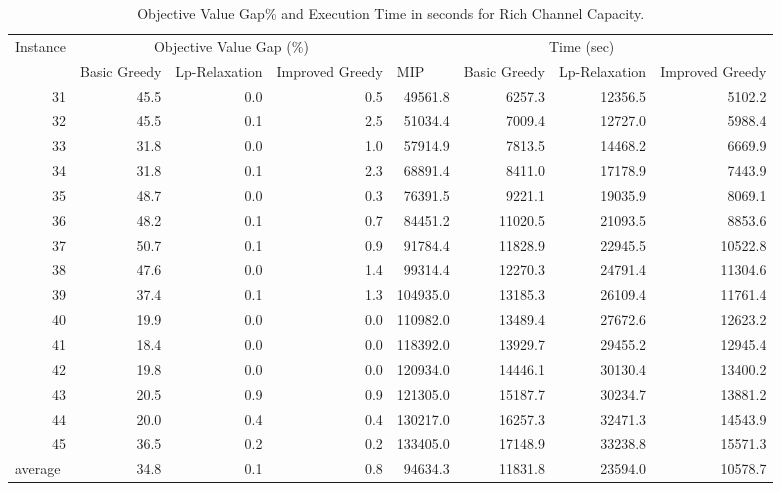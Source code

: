 \documentclass[11pt]{article}
\begin{document}
\begin{table}[htbp]
  \centering
  \caption{Objective Value Gap\% and Execution Time in seconds for Rich Channel Capacity.}\label{table:tbl_exact_rich_results_large}
  \begin{adjustbox}{max width=1\textwidth}
    \begin{tabular}{|l|rrr|rrrr|}
    \toprule
    \multicolumn{1}{|c|}{\multirow{2}[4]{*}{Instance}} & \multicolumn{3}{c|}{Objective Value Gap (\%)} & \multicolumn{4}{c|}{Time (sec)} \\
\cmidrule{2-8}          & \multicolumn{1}{l}{Basic Greedy} & \multicolumn{1}{l}{Lp-Relaxation} & \multicolumn{1}{l|}{Improved Greedy} & \multicolumn{1}{l}{MIP} & \multicolumn{1}{l}{Basic Greedy} & \multicolumn{1}{l}{Lp-Relaxation} & \multicolumn{1}{l|}{Improved Greedy} \\
    \midrule
    \multicolumn{1}{|r|}{31} & 45.5  & 0.0     & 0.5   & 49561.8 & 6257.3 & 12356.5 & 5102.2 \\
    \multicolumn{1}{|r|}{32} & 45.5  & 0.1   & 2.5   & 51034.4 & 7009.4 & 12727.0 & 5988.4 \\
    \multicolumn{1}{|r|}{33} & 31.8  & 0.0     & 1.0     & 57914.9 & 7813.5 & 14468.2 & 6669.9 \\
    \multicolumn{1}{|r|}{34} & 31.8  & 0.1   & 2.3   & 68891.4 & 8411.0  & 17178.9 & 7443.9 \\
    \multicolumn{1}{|r|}{35} & 48.7  & 0.0     & 0.3   & 76391.5 & 9221.1 & 19035.9 & 8069.1 \\
    \multicolumn{1}{|r|}{36} & 48.2  & 0.1   & 0.7   & 84451.2 & 11020.5 & 21093.5 & 8853.6 \\
    \multicolumn{1}{|r|}{37} & 50.7  & 0.1   & 0.9   & 91784.4 & 11828.9 & 22945.5 & 10522.8 \\
    \multicolumn{1}{|r|}{38} & 47.6  & 0.0    & 1.4   & 99314.4 & 12270.3 & 24791.4 & 11304.6 \\
    \multicolumn{1}{|r|}{39} & 37.4  & 0.1   & 1.3   & 104935.0 & 13185.3 & 26109.4 & 11761.4 \\
    \multicolumn{1}{|r|}{40} & 19.9  & 0.0   & 0.0    & 110982.0 & 13489.4 & 27672.6 & 12623.2 \\
    \multicolumn{1}{|r|}{41} & 18.4  & 0.0   & 0.0    & 118392.0 & 13929.7 & 29455.2 & 12945.4 \\
    \multicolumn{1}{|r|}{42} & 19.8  & 0.0   & 0.0    & 120934.0 & 14446.1 & 30130.4 & 13400.2 \\
    \multicolumn{1}{|r|}{43} & 20.5  & 0.9   & 0.9   & 121305.0 & 15187.7 & 30234.7 & 13881.2 \\
    \multicolumn{1}{|r|}{44} & 20.0  & 0.4   & 0.4   & 130217.0 & 16257.3 & 32471.3 & 14543.9 \\
    \multicolumn{1}{|r|}{45} & 36.5  & 0.2   & 0.2   & 133405.0 & 17148.9 & 33238.8 & 15571.3 \\
    \midrule
    average & 34.8  & 0.1   & 0.8   & 94634.3 & 11831.8 & 23594.0 & 10578.7 \\
    \bottomrule
    \end{tabular}
  \end{adjustbox}
\end{table}
\end{document}
